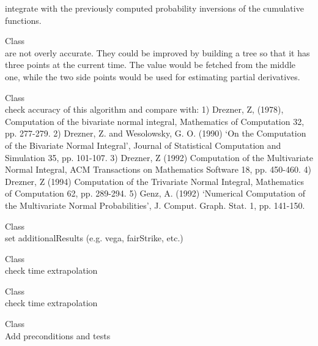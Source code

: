 \begin{DoxyRefList}
integrate with the previously computed probability inversions of the cumulative functions.  
\item[Class \doxylink{class_quant_lib_1_1_binomial_vanilla_engine}{Quant\+Lib\+::Binomial\+Vanilla\+Engine\texorpdfstring{$<$}{<} T \texorpdfstring{$>$}{>}} ]\hfill \\
\label{todo__todo000066}%
%
 are not overly accurate. They could be improved by building a tree so that it has three points at the current time. The value would be fetched from the middle one, while the two side points would be used for estimating partial derivatives.  
\item[Class \doxylink{class_quant_lib_1_1_bivariate_cumulative_normal_distribution_dr78}{Quant\+Lib\+::Bivariate\+Cumulative\+Normal\+Distribution\+Dr78} ]\hfill \\
\label{todo__todo000045}%
%
check accuracy of this algorithm and compare with\+: 1) Drezner, Z, (1978), Computation of the bivariate normal integral, Mathematics of Computation 32, pp. 277-\/279. 2) Drezner, Z. and Wesolowsky, G. O. (1990) `On the Computation of the Bivariate Normal Integral', Journal of Statistical Computation and Simulation 35, pp. 101-\/107. 3) Drezner, Z (1992) Computation of the Multivariate Normal Integral, ACM Transactions on Mathematics Software 18, pp. 450-\/460. 4) Drezner, Z (1994) Computation of the Trivariate Normal Integral, Mathematics of Computation 62, pp. 289-\/294. 5) Genz, A. (1992) `Numerical Computation of the Multivariate Normal Probabilities', J. Comput. Graph. Stat. 1, pp. 141-\/150. 
\item[Class \doxylink{class_quant_lib_1_1_black_callable_fixed_rate_bond_engine}{Quant\+Lib\+::Black\+Callable\+Fixed\+Rate\+Bond\+Engine} ]\hfill \\
\label{todo__todo000006}%
%
set additional\+Results (e.\+g. vega, fair\+Strike, etc.) 
\item[Class \doxylink{class_quant_lib_1_1_black_variance_curve}{Quant\+Lib\+::Black\+Variance\+Curve} ]\hfill \\
\label{todo__todo000070}%
%
check time extrapolation 
\item[Class \doxylink{class_quant_lib_1_1_black_variance_surface}{Quant\+Lib\+::Black\+Variance\+Surface} ]\hfill \\
\label{todo__todo000071}%
%
check time extrapolation 
\item[Class \doxylink{class_quant_lib_1_1_bond_forward}{Quant\+Lib\+::Bond\+Forward} ]\hfill \\
\label{todo__todo000037}%
%
Add preconditions and tests


\end{DoxyRefList}
